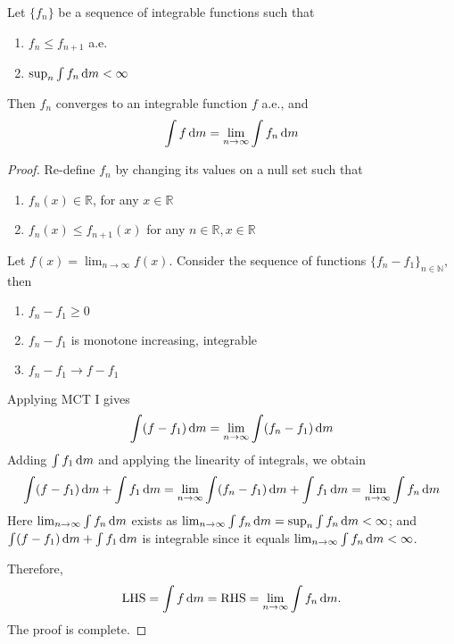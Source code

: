 \begin{theorem}[MCT II]
Let $\{f_n\}$ be a sequence of integrable functions such that
\begin{enumerate}
\item
$f_n\le f_{n+1}$ a.e.
\item
$\sup_n\int f_n\,\mathrm{d} m<\infty$
\end{enumerate}
Then $f_n$ converges to an integrable function $f$ a.e., and
\[
\int f\,\mathrm{d} m = \lim_{n\to\infty}\int f_n\,\mathrm{d} m
\]
\end{theorem}
\begin{proof}
Re-define $f_n$ by changing its values on a null set such that
\begin{enumerate}
\item
$f_n(x)\in\mathbb{R}$, for any $x\in\mathbb{R}$
\item
$f_n(x)\le f_{n+1}(x)$ for any $n\in\mathbb{R},x\in\mathbb{R}$
\end{enumerate}
Let $f(x) = \lim_{n\to\infty}f(x)$.
Consider the sequence of functions $\{f_n - f_1\}_{n\in\mathbb{N}}$, then
\begin{enumerate}
\item
$f_n-f_1\ge0$
\item
$f_n-f_1$ is monotone increasing, integrable
\item
$f_n-f_1\to f-f_1$
\end{enumerate}
Applying MCT I gives 
\[
\int(f-f_1)\,\mathrm{d} m =\lim_{n\to\infty}\int(f_n-f_1)\,\mathrm{d} m
\]
Adding $\int f_1\,\mathrm{d} m$ and applying the linearity of integrals, we obtain
\[
\int(f-f_1)\,\mathrm{d} m+\int f_1\,\mathrm{d} m
=
\lim_{n\to\infty}\int(f_n-f_1)\,\mathrm{d} m+\int f_1\,\mathrm{d} m
=
\lim_{n\to\infty}\int f_n\,\mathrm{d} m 
\]
Here $\lim_{n\to\infty}\int f_n\,\mathrm{d} m $ exists as $\lim_{n\to\infty}\int f_n\,\mathrm{d} m =\sup_n\int f_n\,\mathrm{d} m<\infty$; and $\int(f-f_1)\,\mathrm{d} m+\int f_1\,\mathrm{d} m$ is integrable since it equals $\lim_{n\to\infty}\int f_n\,\mathrm{d} m<\infty$.

Therefore,
\[
\text{LHS}=\int f\,\mathrm{d} m = \text{RHS}=\lim_{n\to\infty}\int f_n\,\mathrm{d} m.
\]
The proof is complete.
\end{proof}


















